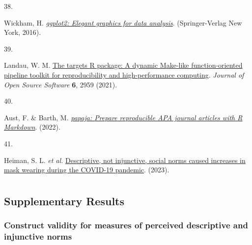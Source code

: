 \documentclass[
  man, donotrepeattitle,floatsintext]{apa6}
\newlength{\cslhangindent}
\newlength{\csllabelwidth}
\newlength{\cslentryspacingunit} %
\newenvironment{CSLReferences}[2] %
 {%
  \setlength{\parindent}{0pt}
  \ifodd #1
  \let\oldpar\par
  \def\par{\hangindent=\cslhangindent\oldpar}
  \fi
  \setlength{\parskip}{#2\cslentryspacingunit}
 }%
 {}
\newcommand{\CSLLeftMargin}[1]{\parbox[t]{\csllabelwidth}{#1}}
\newcommand{\CSLRightInline}[1]{\parbox[t]{\linewidth - \csllabelwidth}{#1}\break}
\begin{document}
\begin{CSLReferences}{0}{0}
\leavevmode{}%
\CSLLeftMargin{38. }%
\CSLRightInline{Wickham, H. \emph{\href{https://ggplot2.tidyverse.org}{{ggplot2}: Elegant graphics for data analysis}}. (Springer-Verlag New York, 2016).}

\leavevmode{}%
\CSLLeftMargin{39. }%
\CSLRightInline{Landau, W. M. \href{https://doi.org/10.21105/joss.02959}{The targets {R} package: A dynamic {M}ake-like function-oriented pipeline toolkit for reproducibility and high-performance computing}. \emph{Journal of Open Source Software} \textbf{6}, 2959 (2021).}

\leavevmode{}%
\CSLLeftMargin{40. }%
\CSLRightInline{Aust, F. \& Barth, M. \emph{\href{https://github.com/crsh/papaja}{{papaja}: {Prepare} reproducible {APA} journal articles with {R Markdown}}}. (2022).}

\leavevmode{}%
\CSLLeftMargin{41. }%
\CSLRightInline{Heiman, S. L. \emph{et al.} \href{https://github.com/ScottClaessens/covidMaskWearing}{Descriptive, not injunctive, social norms caused increases in mask wearing during the COVID-19 pandemic}. (2023).}

\end{CSLReferences}

\endgroup

\newpage

\hypertarget{appendix-appendix}{%
\appendix}


\renewcommand{\appendixname}{\textbf{Supplementary Material}}
\renewcommand{\thefigure}{S\arabic{figure}} \setcounter{figure}{0}
\renewcommand{\thetable}{S\arabic{table}} \setcounter{table}{0}
\renewcommand{\theequation}{S\arabic{table}} \setcounter{equation}{0}
\nolinenumbers

\hypertarget{section}{%
\section{}\label{section}}

\hypertarget{supplementary-results}{%
\subsection{Supplementary Results}\label{supplementary-results}}

\hypertarget{construct-validity-for-measures-of-perceived-descriptive-and-injunctive-norms}{%
\subsubsection{Construct validity for measures of perceived descriptive and injunctive norms}\label{construct-validity-for-measures-of-perceived-descriptive-and-injunctive-norms}}
\end{document}
